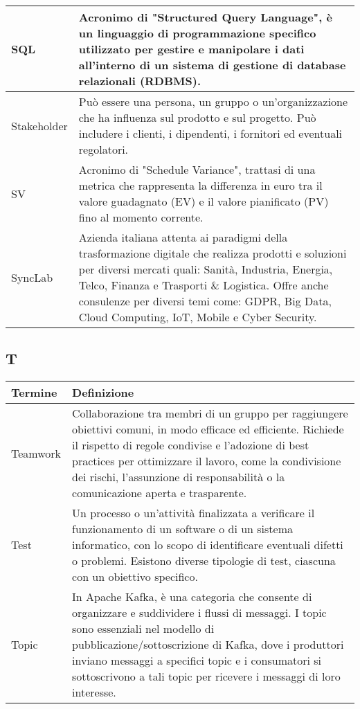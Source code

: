 \documentclass[10pt]{article}
\begin{document}
\begin{longtable}{|>{\centering\arraybackslash}m{2.5cm}|>{\arraybackslash}m{12.5cm}|}
SQL & Acronimo di "Structured Query Language", è un linguaggio di programmazione specifico utilizzato per gestire e manipolare i dati all'interno di un sistema di gestione di database relazionali (RDBMS).\\
\hline
Stakeholder & Può essere una persona, un gruppo o un'organizzazione che ha influenza sul prodotto e sul progetto. Può includere i clienti, i dipendenti, i fornitori ed eventuali regolatori.\\
\hline
SV & Acronimo di "Schedule Variance", trattasi di una metrica che rappresenta la differenza in euro tra il valore guadagnato (EV) e il valore pianificato (PV) fino al momento corrente.\\
\hline
SyncLab & Azienda italiana attenta ai paradigmi della trasformazione digitale che realizza prodotti e soluzioni per diversi mercati quali: Sanità, Industria, Energia, Telco, Finanza e Trasporti \& Logistica. Offre anche consulenze per diversi temi come: GDPR, Big Data, Cloud Computing, IoT, Mobile e Cyber Security.\\
\hline
\end{longtable}

\subsection{T} %
\begin{longtable}{|>{\centering\arraybackslash}m{2.5cm}|>{\arraybackslash}m{12.5cm}|}
\hline
\rowcolor[gray]{0.8}
\textbf{Termine} & \textbf{Definizione}\\
\endhead
\hline
Teamwork & Collaborazione tra membri di un gruppo per raggiungere obiettivi comuni, in modo efficace ed efficiente. Richiede il rispetto di regole condivise e l'adozione di best practices per ottimizzare il lavoro, come la condivisione dei rischi, l'assunzione di responsabilità o la comunicazione aperta e trasparente.\\
\hline
Test & Un processo o un'attività finalizzata a verificare il funzionamento di un software o di un sistema informatico, con lo scopo di identificare eventuali difetti o problemi. Esistono diverse tipologie di test, ciascuna con un obiettivo specifico.\\
\hline
Topic & In Apache Kafka, è una categoria che consente di organizzare e suddividere i flussi di messaggi. I topic sono essenziali nel modello di pubblicazione/sottoscrizione di Kafka, dove i produttori inviano messaggi a specifici topic e i consumatori si sottoscrivono a tali topic per ricevere i messaggi di loro interesse.\\
\hline
\end{longtable}
\end{document}
